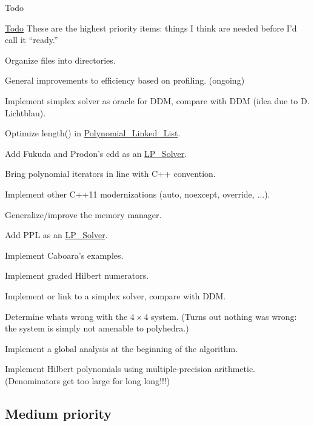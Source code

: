 \begin{DoxyRefDesc}{Todo}
\item[\hyperlink{todo__todo000001}{Todo}]These are the highest priority items\+: things I think are needed before I'd call it ``ready.''
\begin{DoxyItemize}
\item Organize files into directories.
\item General improvements to efficiency based on profiling. (ongoing)
\item Implement simplex solver as oracle for D\+DM, compare with D\+DM (idea due to D. Lichtblau).
\item Optimize length() in \hyperlink{group__polygroup_class_polynomial___linked___list}{Polynomial\+\_\+\+Linked\+\_\+\+List}.
\item Add Fukuda and Prodon's cdd as an \hyperlink{group___c_l_s_solvers_class_l_p___solver}{L\+P\+\_\+\+Solver}. \cite{Fukuda_DoubleDescriptionRevisited}
\item Bring polynomial iterators in line with C++ convention.
\item Implement other C++11 modernizations ({\ttfamily auto}, {\ttfamily noexcept}, {\ttfamily override}, {$\dots$}).
\item Generalize/improve the memory manager.
\item Add P\+PL as an \hyperlink{group___c_l_s_solvers_class_l_p___solver}{L\+P\+\_\+\+Solver}. \cite{BagnaraHZ08SCP}
\item Implement Caboara's examples.
\item Implement graded Hilbert numerators.
\item Implement or link to a simplex solver, compare with D\+DM.
\item Determine what\textquotesingle{}s wrong with the $4\times4$ system. (Turns out nothing was wrong\+: the system is simply not amenable to polyhedra.)
\item Implement a global analysis at the beginning of the algorithm.
\item Implement Hilbert polynomials using multiple-\/precision arithmetic. (Denominators get too large for {\ttfamily long long}!!!)
\end{DoxyItemize}\end{DoxyRefDesc}
\hypertarget{index_mdpri}{}\subsection{Medium priority}\label{index_mdpri}
